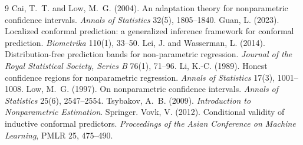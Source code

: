 \documentclass[11pt]{article}
\theoremstyle{definition}
\theoremstyle{remark}
\begin{document}

\begin{thebibliography}{9}
 Cai, T.~T. and Low, M.~G. (2004). An
  adaptation theory for nonparametric confidence intervals. \emph{Annals of Statistics}
  32(5), 1805--1840.
 Guan, L. (2023). Localized conformal prediction: a
  generalized inference framework for conformal prediction. \emph{Biometrika} 110(1), 33--50.
 Lei, J. and Wasserman, L. (2014).
  Distribution-free prediction bands for non-parametric regression. \emph{Journal of the
  Royal Statistical Society, Series B} 76(1), 71--96.
 Li, K.-C. (1989). Honest confidence regions for
  nonparametric regression. \emph{Annals of Statistics} 17(3), 1001--1008.
 Low, M.~G. (1997). On nonparametric confidence
  intervals. \emph{Annals of Statistics} 25(6), 2547--2554.
 Tsybakov, A.~B. (2009).
  \emph{Introduction to Nonparametric Estimation}. Springer.
 Vovk, V. (2012). Conditional validity of
  inductive conformal predictors. \emph{Proceedings of the Asian Conference on Machine
  Learning}, PMLR 25, 475--490.
\end{thebibliography}
\end{document}
